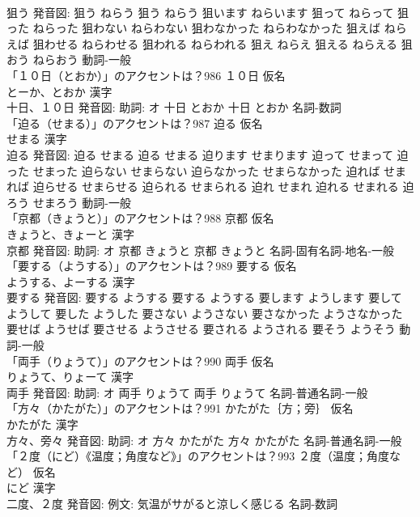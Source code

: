 \documentclass[8pt]{extreport}
\begin{document}
\begin{CJK}{UTF8}{min}
\\	狙う 発音図:	狙う ねらう		狙う ねらう 狙います ねらいます 狙って ねらって 狙った ねらった 狙わない ねらわない 狙わなかった ねらわなかった 狙えば ねらえば 狙わせる ねらわせる 狙われる ねらわれる 狙え ねらえ 狙える ねらえる 狙おう ねらおう				動詞-一般 
\\	「１０日（とおか）」のアクセントは？986	１０日 仮名　
\\	とーか、とおか 漢字　
\\	十日、１０日 発音図: 助詞: オ	十日 とおか		十日 とおか				名詞-数詞 
\\	「迫る（せまる）」のアクセントは？987	迫る 仮名　
\\	せまる 漢字　
\\	迫る 発音図:	迫る せまる		迫る せまる 迫ります せまります 迫って せまって 迫った せまった 迫らない せまらない 迫らなかった せまらなかった 迫れば せまれば 迫らせる せまらせる 迫られる せまられる 迫れ せまれ 迫れる せまれる 迫ろう せまろう				動詞-一般 
\\	「京都（きょうと）」のアクセントは？988	京都 仮名　
\\	きょうと、きょーと 漢字　
\\	京都 発音図: 助詞: オ	京都 きょうと		京都 きょうと				名詞-固有名詞-地名-一般 
\\	「要する（ようする）」のアクセントは？989	要する 仮名　
\\	ようする、よーする 漢字　
\\	要する 発音図:	要する ようする		要する ようする 要します ようします 要して ようして 要した ようした 要さない ようさない 要さなかった ようさなかった 要せば ようせば 要させる ようさせる 要される ようされる 要そう ようそう				動詞-一般 
\\	「両手（りょうて）」のアクセントは？990	両手 仮名　
\\	りょうて、りょーて 漢字　
\\	両手 発音図: 助詞: オ	両手 りょうて		両手 りょうて				名詞-普通名詞-一般 
\\	「方々（かたがた）」のアクセントは？991	かたがた｛方；旁｝ 仮名　
\\	かたがた 漢字　
\\	方々、旁々 発音図: 助詞: オ	方々 かたがた		方々 かたがた				名詞-普通名詞-一般 
\\	「２度（にど）《温度；角度など》」のアクセントは？993	２度（温度；角度など） 仮名　
\\	にど 漢字　
\\	二度、２度 発音図: 例文: 気温がサがると涼しく感じる							名詞-数詞 

\end{CJK}
\end{document}
